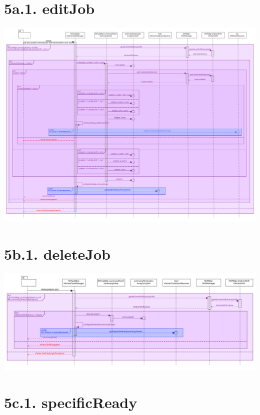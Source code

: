 \pagebreak

\section*{5a.1. editJob}

\begin{center}
  \includegraphics[scale = 0.23]{images/DSD/DSD 5a.png}
\end{center}

\pagebreak

\section*{5b.1. deleteJob}

\begin{center}
  \includegraphics[scale = 0.28]{images/DSD/DSD 5b.png}
\end{center}

\pagebreak

\section*{5c.1. specificReady}

